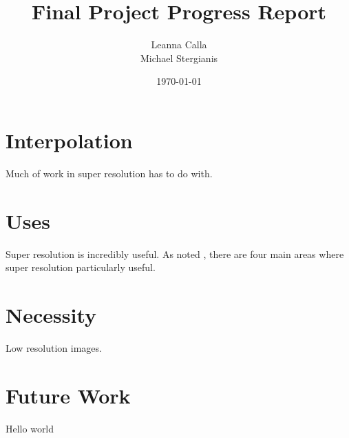 \documentclass{article}
\title{Final Project Progress Report}
\author{Leanna Calla\\Michael Stergianis}
\date{\today}
\begin{document}
\maketitle
\section{Interpolation}
\label{sec:interpolation}
Much of work in super resolution has to do with. 
%
%
\section{Uses}
\label{sec:uses}
Super resolution is incredibly useful. As noted
\cite{Yang2010ImageSH}, there are four main areas where super
resolution particularly useful. 
%
%
\section{Necessity}
\label{sec:necessity}
Low resolution images.
%
%
\section{Future Work}
\label{sec:future}
Hello world
%
\printbibliography
\end{document}
